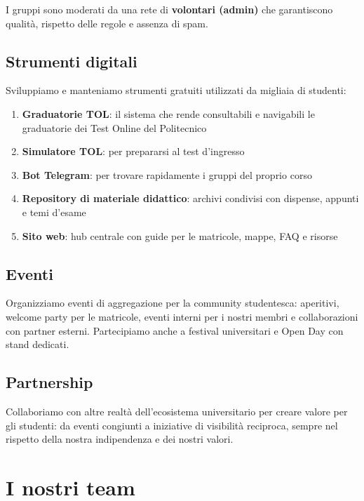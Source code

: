 \documentclass[letter]{polinetwork}
\begin{document}
I gruppi sono moderati da una rete di \textbf{volontari (admin)} che
garantiscono qualità, rispetto delle regole e assenza di spam.

\subsection{Strumenti digitali}

Sviluppiamo e manteniamo strumenti gratuiti utilizzati da migliaia
di studenti:

\begin{enumerate}[leftmargin=2em]
	\item \textbf{Graduatorie TOL}: il sistema che rende consultabili
	      e navigabili le graduatorie dei Test Online del Politecnico
	\item \textbf{Simulatore TOL}: per prepararsi al test d'ingresso
	\item \textbf{Bot Telegram}: per trovare rapidamente i gruppi del
	      proprio corso
	\item \textbf{Repository di materiale didattico}: archivi condivisi
	      con dispense, appunti e temi d'esame
	\item \textbf{Sito web}: hub centrale con guide per le matricole,
	      mappe, FAQ e risorse
\end{enumerate}

\subsection{Eventi}

Organizziamo eventi di aggregazione per la community studentesca:
aperitivi, welcome party per le matricole, eventi interni per i
nostri membri e collaborazioni con partner esterni. Partecipiamo
anche a festival universitari e Open Day con stand dedicati.

\subsection{Partnership}

Collaboriamo con altre realtà dell'ecosistema universitario per
creare valore per gli studenti: da eventi congiunti a iniziative
di visibilità reciproca, sempre nel rispetto della nostra
indipendenza e dei nostri valori.

\section{I nostri team}
\end{document}
